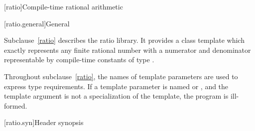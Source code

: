[ratio]{Compile-time rational arithmetic}

[ratio.general]{General}

\pnum
{}%
Subclause~\ref{ratio} describes the ratio library. It provides a class template
 which exactly represents any finite rational number with a
numerator and denominator representable by compile-time constants of type
.

\pnum
Throughout subclause~\ref{ratio}, the names of template parameters are used to express
type requirements. If a template parameter is named  or ,
and the template argument is not a specialization of the  template,
the program is ill-formed.

[ratio.syn]{Header  synopsis}


